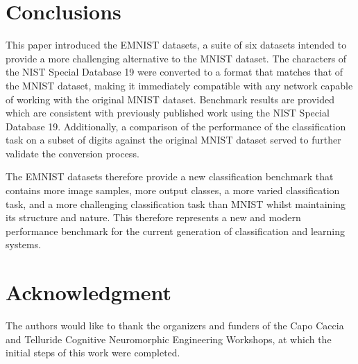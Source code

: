 \documentclass[conference]{IEEEtran}
\begin{document}
\section{Conclusions}
\label{sec:conclusions}

This paper introduced the EMNIST datasets, a suite of six datasets intended to provide a more challenging alternative to the MNIST dataset. The characters of the NIST Special Database 19 were converted to a format that matches that of the MNIST dataset, making it immediately compatible with any network capable of working with the original MNIST dataset. Benchmark results are provided which are consistent with previously published work using the NIST Special Database 19. Additionally, a comparison of the performance of the classification task on a subset of digits against the original MNIST dataset served to further validate the conversion process.

The EMNIST datasets therefore provide a new classification benchmark that contains more image samples, more output classes, a more varied classification task, and a more challenging classification task than MNIST whilst maintaining its structure and nature. This therefore represents a new and modern performance benchmark for the current generation of classification  and learning systems.


\section*{Acknowledgment}
\label{sec:acknowledgments}
The authors would like to thank the organizers and funders of the Capo Caccia and Telluride Cognitive Neuromorphic Engineering Workshops, at which the initial steps of this work were completed. 




\end{document}
